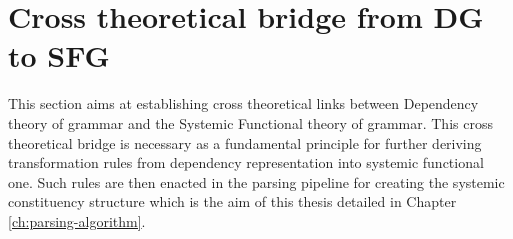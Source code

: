 %

\section{Cross theoretical bridge from DG to SFG}
\label{sec:cross-theoretical-bridge}
\label{sec:dependency-relations-sfl}



%
This section aims at establishing cross theoretical links between Dependency theory of grammar and the Systemic Functional theory of grammar. This cross theoretical bridge is necessary as a fundamental principle for further deriving transformation rules from dependency representation into systemic functional one. Such rules are then enacted in the parsing pipeline for creating the systemic constituency structure which is the aim of this thesis detailed in Chapter \ref{ch:parsing-algorithm}.

